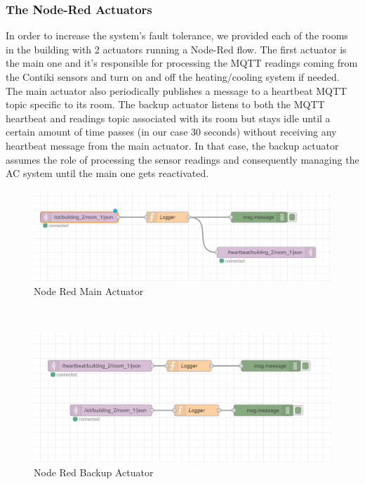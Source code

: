 \documentclass{article}
\begin{document}
\subsubsection{The Node-Red Actuators}
In order to increase the system's fault tolerance, we provided each of the rooms in the building with 2 actuators running a Node-Red flow. 
The first actuator is the main one and it's responsible for processing the MQTT readings coming from the Contiki sensors and turn on and off the heating/cooling system if needed. 
\\
The main actuator also periodically publishes a message to a heartbeat MQTT topic specific to its room. 
The backup actuator listens to both the MQTT heartbeat and readings topic associated with its room but stays idle until a certain amount of time passes (in our case 30 seconds) without receiving any heartbeat message from the main actuator. In that case, the backup actuator assumes the role of processing the sensor readings and consequently managing the AC system until the main one gets reactivated.  
\\
\begin{figure}[htp]
	\centering
	\includegraphics[width=\linewidth]{resources/mainActuator.png}
	\caption{Node Red Main Actuator}
	\label{fig:client_server_diag}
\end{figure}
\\
\begin{figure}[htp]
	\centering
	\includegraphics[width=\linewidth]{resources/backupActuator.png}
	\caption{Node Red Backup Actuator}
	\label{fig:client_server_diag}
\end{figure}
\pagebreak
\end{document}
